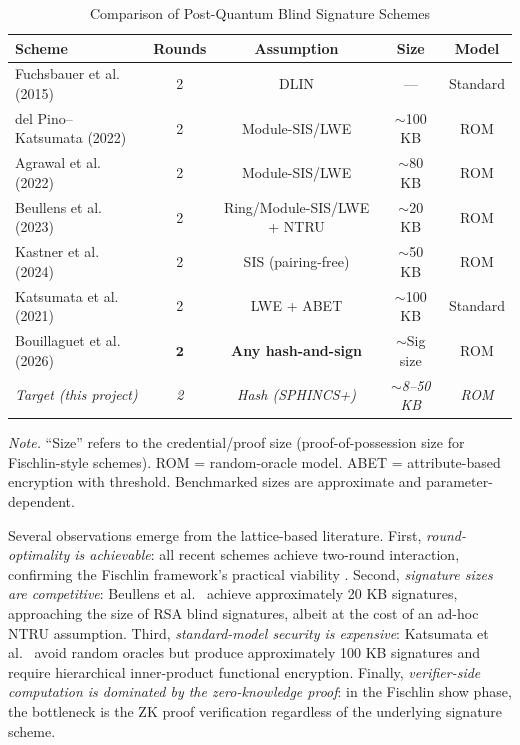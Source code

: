 \documentclass[11pt,a4paper]{article}
\begin{document}
\begin{table}[t]
\centering
\caption{Comparison of Post-Quantum Blind Signature Schemes}
\label{tab:pqblind}
\begin{threeparttable}
\begin{tabular}{lcccc}
\toprule
\textbf{Scheme} & \textbf{Rounds} & \textbf{Assumption} & \textbf{Size} & \textbf{Model} \\
\midrule
Fuchsbauer et al. (2015) \cite{Fuchsbauer2015Practical} & 2 & DLIN & --- & Standard \\
del Pino--Katsumata (2022) \cite{delPino2022Framework} & 2 & Module-SIS/LWE & $\sim$100 KB & ROM \\
Agrawal et al. (2022) \cite{Agrawal2022Practical} & 2 & Module-SIS/LWE & $\sim$80 KB & ROM \\
Beullens et al. (2023) \cite{Beullens2023LatticeBlind} & 2 & Ring/Module-SIS/LWE + NTRU & $\sim$20 KB & ROM \\
Kastner et al. (2024) \cite{Kastner2024PairingFree} & 2 & SIS (pairing-free) & $\sim$50 KB & ROM \\
Katsumata et al. (2021) \cite{Katsumata2021} & 2 & LWE + ABET & $\sim$100 KB & Standard \\
\midrule
Bouillaguet et al. (2026) \cite{Bouillaguet2026BlindingPH} & $\mathbf{2}$ & \textbf{Any hash-and-sign} & $\sim$Sig size & ROM \\
\midrule
\textit{Target (this project)} & \textit{2} & \textit{Hash (SPHINCS+)} & \textit{$\sim$8--50 KB} & \textit{ROM} \\
\bottomrule
\end{tabular}
\begin{tablenotes}
\small
\item \emph{Note.}  ``Size'' refers to the credential/proof size
(proof-of-possession
size for Fischlin-style schemes).  ROM = random-oracle model.  ABET = attribute-based encryption
with threshold.  Benchmarked sizes are approximate and parameter-dependent.
\end{tablenotes}
\end{threeparttable}
\end{table}

Several observations emerge from the lattice-based literature.  First, \emph{round-optimality is
achievable}: all recent schemes achieve two-round interaction, confirming the Fischlin framework's
practical viability \cite{Fuchsbauer2015Practical,delPino2022Framework}.  Second,
\emph{signature sizes are competitive}: Beullens et al.~\cite{Beullens2023LatticeBlind} achieve
approximately 20 KB signatures, approaching the size of RSA blind signatures, albeit at the cost
of an ad-hoc NTRU assumption.  Third, \emph{standard-model security is expensive}:
Katsumata et al.~\cite{Katsumata2021} avoid random oracles but produce approximately 100 KB
signatures and require hierarchical inner-product functional encryption.  Finally,
\emph{verifier-side computation is dominated by the zero-knowledge proof}: in the Fischlin
show phase, the bottleneck is the ZK proof verification regardless of the underlying signature
scheme.
\end{document}
